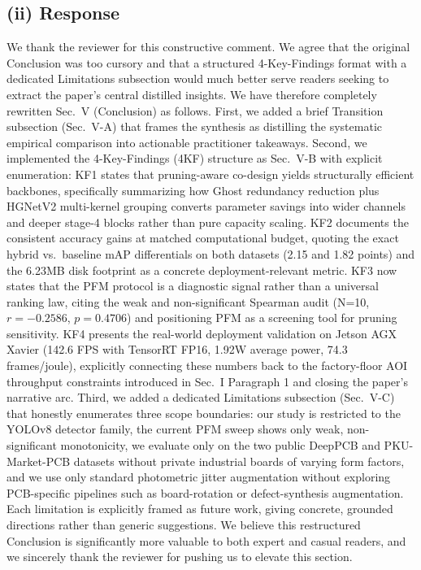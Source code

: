 \documentclass[conference]{IEEEtran}
\begin{document}
\subsection*{(ii) Response}
We thank the reviewer for this constructive comment. We agree that the original Conclusion was too cursory and that a structured 4-Key-Findings format with a dedicated Limitations subsection would much better serve readers seeking to extract the paper's central distilled insights. We have therefore completely rewritten Sec.~V (Conclusion) as follows. First, we added a brief Transition subsection (Sec.~V-A) that frames the synthesis as distilling the systematic empirical comparison into actionable practitioner takeaways. Second, we implemented the 4-Key-Findings (4KF) structure as Sec.~V-B with explicit enumeration: KF1 states that pruning-aware co-design yields structurally efficient backbones, specifically summarizing how Ghost redundancy reduction plus HGNetV2 multi-kernel grouping converts parameter savings into wider channels and deeper stage-4 blocks rather than pure capacity scaling. KF2 documents the consistent accuracy gains at matched computational budget, quoting the exact hybrid vs.~baseline mAP differentials on both datasets (2.15 and 1.82 points) and the 6.23MB disk footprint as a concrete deployment-relevant metric. KF3 now states that the PFM protocol is a diagnostic signal rather than a universal ranking law, citing the weak and non-significant Spearman audit (N=10, $r=-0.2586$, $p=0.4706$) and positioning PFM as a screening tool for pruning sensitivity. KF4 presents the real-world deployment validation on Jetson AGX Xavier (142.6 FPS with TensorRT FP16, 1.92W average power, 74.3 frames/joule), explicitly connecting these numbers back to the factory-floor AOI throughput constraints introduced in Sec.~I Paragraph 1 and closing the paper's narrative arc. Third, we added a dedicated Limitations subsection (Sec.~V-C) that honestly enumerates three scope boundaries: our study is restricted to the YOLOv8 detector family, the current PFM sweep shows only weak, non-significant monotonicity, we evaluate only on the two public DeepPCB and PKU-Market-PCB datasets without private industrial boards of varying form factors, and we use only standard photometric jitter augmentation without exploring PCB-specific pipelines such as board-rotation or defect-synthesis augmentation. Each limitation is explicitly framed as future work, giving concrete, grounded directions rather than generic suggestions. We believe this restructured Conclusion is significantly more valuable to both expert and casual readers, and we sincerely thank the reviewer for pushing us to elevate this section.
\end{document}
